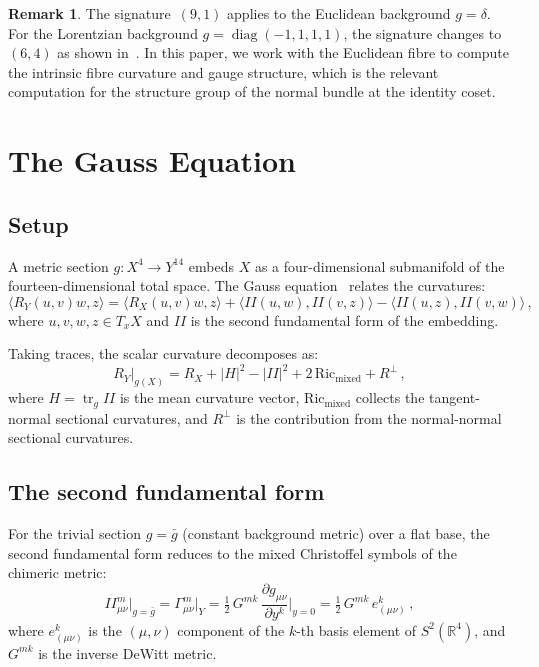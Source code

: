 \documentclass[12pt,a4paper]{article}
\theoremstyle{definition}
\newtheorem{remark}[theorem]{Remark}
\newcommand{\tr}{\operatorname{tr}}
\newcommand{\diag}{\operatorname{diag}}
\newcommand{\R}{\mathbb{R}}
\begin{document}
\begin{remark}
The signature~$(9,1)$ applies to the Euclidean background $g = \delta$.
For the Lorentzian background $g = \diag(-1,1,1,1)$, the signature changes to~$(6,4)$ as shown in~\cite{Paper1}.
In this paper, we work with the Euclidean fibre to compute the intrinsic fibre curvature and gauge structure, which is the relevant computation for the structure group of the normal bundle at the identity coset.
\end{remark}


\section{The Gauss Equation}
\label{sec:gauss}

\subsection{Setup}

A metric section $g\colon X^4 \to Y^{14}$ embeds $X$ as a four-dimensional submanifold of the fourteen-dimensional total space.
The Gauss equation~\cite{KobayashiNomizu} relates the curvatures:
\begin{equation}
\label{eq:gauss}
\langle R_Y(u,v)w, z \rangle = \langle R_X(u,v)w, z \rangle + \langle II(u,w), II(v,z) \rangle - \langle II(u,z), II(v,w) \rangle\,,
\end{equation}
where $u, v, w, z \in T_xX$ and $II$ is the second fundamental form of the embedding.

Taking traces, the scalar curvature decomposes as:
\begin{equation}
\label{eq:scalar_decomp}
R_Y\big|_{g(X)} = R_X + |H|^2 - |II|^2 + 2\,\mathrm{Ric}_{\mathrm{mixed}} + R^\perp\,,
\end{equation}
where $H = \tr_g II$ is the mean curvature vector, $\mathrm{Ric}_{\mathrm{mixed}}$ collects the tangent-normal sectional curvatures, and $R^\perp$ is the contribution from the normal-normal sectional curvatures.

\subsection{The second fundamental form}

For the trivial section $g = \bar{g}$ (constant background metric) over a flat base, the second fundamental form reduces to the mixed Christoffel symbols of the chimeric metric:
\begin{equation}
II^m_{\mu\nu}\big|_{g=\bar{g}} = \Gamma^m_{\mu\nu}\big|_Y = \tfrac{1}{2}\, G^{mk}\, \frac{\partial g_{\mu\nu}}{\partial y^k}\bigg|_{y=0} = \tfrac{1}{2}\, G^{mk}\, e^k_{(\mu\nu)}\,,
\end{equation}
where $e^k_{(\mu\nu)}$ is the $(\mu,\nu)$ component of the $k$-th basis element of $S^2(\R^4)$, and $G^{mk}$ is the inverse DeWitt metric.
\end{document}
